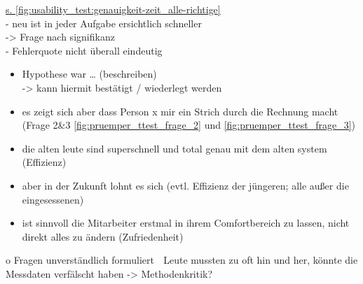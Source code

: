 \noindent
\underline{s. \autoref{fig:usability_test:genauigkeit-zeit_alle-richtige}}\\
- neu ist in jeder Aufgabe ersichtlich schneller\\
-> Frage nach signifikanz\\
- Fehlerquote nicht überall eindeutig\\

\begin{itemize}
    \item Hypothese war … (beschreiben)\\
        -> kann hiermit bestätigt / wiederlegt werden
    \item es zeigt sich aber dass Person x mir ein Strich durch die Rechnung macht (Frage 2\&3 \autoref{fig:pruemper_ttest_frage_2} und \autoref{fig:pruemper_ttest_frage_3})
    \item die alten leute sind superschnell und total genau mit dem alten system (Effizienz)
    \item aber in der Zukunft lohnt es sich (evtl. Effizienz der jüngeren; alle außer die eingesessenen)
    \item ist sinnvoll die Mitarbeiter erstmal in ihrem Comfortbereich zu lassen, nicht direkt alles zu ändern (Zufriedenheit)
\end{itemize}

o	Fragen unverständlich formuliert
 Leute mussten zu oft hin und her, könnte die Messdaten verfälscht haben
-> Methodenkritik?
